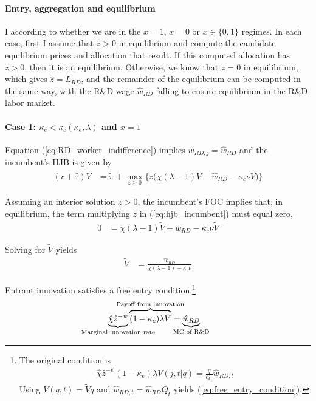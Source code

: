 \documentclass[11pt,english]{article}
\theoremstyle{remark}
\begin{document}
\paragraph{Entry, aggregation and equilibrium}

I according to whether we are in the $x = 1$, $x = 0$ or $x \in \{0,1\}$ regimes. In each case, first I assume that $z > 0$ in equilibrium and compute the candidate equilibrium prices and allocation that result. If this computed allocation has $z > 0$, then it is an equilibrium. Otherwise, we know that $z = 0$ in equilibrium, which gives $\hat{z} = \bar{L}_{RD}$, and the remainder of the equilibrium can be computed in the same way, with the R\&D wage $\hat{w}_{RD}$ falling to ensure equilibrium in the R\&D labor market. 

\paragraph{Case 1: $\kappa_c < \bar{\kappa}_c(\kappa_e,\lambda)$ and $x = 1$}

Equation (\ref{eq:RD_worker_indifference}) implies $w_{RD,j} = \hat{w}_{RD}$ and the incumbent's HJB is given by 
\begin{align}
(r + \hat{\tau}) \tilde{V} &= \tilde{\pi} + \max_{z \ge 0} \Big\{z \big(\chi (\lambda - 1) \tilde{V} - \hat{w}_{RD} - \kappa_{c} \nu \tilde{V}\big) \Big\} \label{eq:hjb_incumbent}
\end{align}

Assuming an interior solution $z > 0$, the incumbent's FOC implies that, in equilibrium, the term multiplying $z$ in (\ref{eq:hjb_incumbent}) must equal zero,
\begin{align*}
	0 &= \chi(\lambda-1)\tilde{V}- \hat{w}_{RD} - \kappa_c \nu \tilde{V}
\end{align*}

Solving for $\tilde{V}$ yields
\begin{align}
	\tilde{V} &= \frac{\hat{w}_{RD}}{\chi(\lambda - 1) - \kappa_{c} \nu} \label{eq:hjb_incumbent_foc}
\end{align}

Entrant innovation satisfies a free entry condition,\footnote{The original condition is 
	\begin{align*}
		\hat{\chi} \hat{z}^{-\psi} (1-\kappa_e) \lambda V(j,t|q) = \frac{q}{Q_t} \hat{w}_{RD,t}
	\end{align*}
	Using $V(q,t) = \tilde{V} q$ and $\hat{w}_{RD,t} = \hat{w}_{RD} Q_t$ yields (\ref{eq:free_entry_condition}).}
\begin{align}
	\underbrace{\hat{\chi} \hat{z}^{-\psi}}_{\mathclap{\text{Marginal innovation rate}}} \overbrace{(1-\kappa_e) \lambda \tilde{V}}^{\mathclap{\text{Payoff from innovation}}} &= \underbrace{\hat{w}_{RD}}_{\mathclap{\text{MC of R\&D}}} \label{eq:free_entry_condition}
\end{align}
\end{document}

